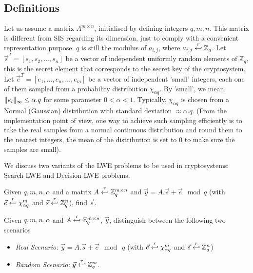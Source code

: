 \subsection{Definitions}
\label{sec:LWEDefs}
Let us assume a matrix $A^{m \times n}$, initialised by defining integers $q, m, n$. This
matrix is different from SIS regarding its dimension, just to comply with a
convenient representation purpose.  $q$ is still the modulus of $a_{i,j}$, where
$a_{i,j} \stackrel{r}{\hookleftarrow} \mathbb{Z}_q$. Let $\vec{s}^T = \left[ s_1,s_2,\dots,s_n \right]$ be a vector of independent uniformly random elements of $\mathbb{Z}_q$, this is the secret element that
corresponds to the secret key of the cryptosystem. Let $\vec{e}^T = [e_1,\dots,e_n,\dots,e_m]$ be a vector of independent 'small' integers, each one of them sampled from a probability distribution $\chi_{\alpha q}$. By 'small', we mean $\Vert e_i \Vert_{\infty} \leq \alpha . q$ for some parameter
$0 < \alpha < 1$. Typically, $\chi_{\alpha q}$ is chosen from a Normal
(Gaussian) distribution with standard deviation $\approx \alpha . q$. (From the
implementation point of view, one way to achieve such sampling efficiently is to take
the real samples from a normal continuous distribution and round them to the
nearest integers, the mean of the distribution is set to 0 to make sure the samples are small).


We discuss two variants of the LWE problems to be used in cryptosystems:
Search-LWE and Decision-LWE problems.

\begin{definition}
   Given $q,m,n,\alpha$ and a matrix
  $A \stackrel{r}{\hookleftarrow} \mathbb{Z}_q^{m \times n}$ and
  $\vec{y} = A.\vec{s} + \vec{e} \mod q$ (with
  $\vec{e} \stackrel{r}{\hookleftarrow} \chi_{\alpha q}^m$ and
  $\vec{s} \stackrel{r}{\hookleftarrow} \mathbb{Z}_q^n$), find $\vec{s}$.
  \label{def:Search-LWEProb}
\end{definition}

\begin{definition}
   Given $q, m, n, \alpha$ and
  $A \stackrel{r}{\hookleftarrow} \mathbb{Z}_q^{m \times n}$, $\vec{y}$, distinguish between
  the following two scenarios
  \begin{itemize}
  \item \emph{Real Scenario:} $\vec{y} = A.\vec{s} + \vec{e} \mod \ q$ (with
    $\vec{e} \stackrel{r}{\hookleftarrow} \chi_{\alpha q}^m$ and
    $\vec{s} \stackrel{r}{\hookleftarrow} \mathbb{Z}_q^n$)
  \item \emph{Random Scenario:} $\vec{y} \stackrel{r}{\hookleftarrow} \mathbb{Z}_q^m$.
  \end{itemize}
  \label{def:Decision-LWEProb}
\end{definition}

